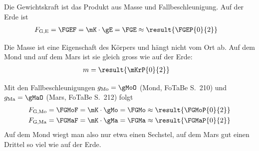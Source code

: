 Die Gewichtskraft ist das Produkt aus Masse und Fallbeschleunigung. Auf der Erde ist
\begin{align}
 F_\text{G,E} &= \FGEF = \mK\cdot\gE = \FGE \approx \result{\FGEP{0}{2}}
\end{align}

Die Masse ist eine Eigenschaft des Körpers und hängt nicht vom Ort ab. Auf dem Mond und auf dem Mars ist sie gleich gross wie auf der Erde:
\begin{align}
 m &= \result{\mKrP{0}{2}}
\end{align}

Mit den Fallbeschleunigungen $g_\text{Mo} = \gMoO$ (Mond, FoTaBe S.~210) und $g_\text{Ma} = \gMaO$ (Mars, FoTaBe S.~212) folgt
\begin{align}
 F_\text{G,Mo} &= \FGMoF = \mK\cdot\gMo = \FGMo \approx \result{\FGMoP{0}{2}} \\
 F_\text{G,Ma} &= \FGMaF = \mK\cdot\gMa = \FGMa \approx \result{\FGMaP{0}{2}}
\end{align}
Auf dem Mond wiegt man also nur etwa einen Sechstel, auf dem Mars gut einen Drittel so viel wie auf der Erde.
